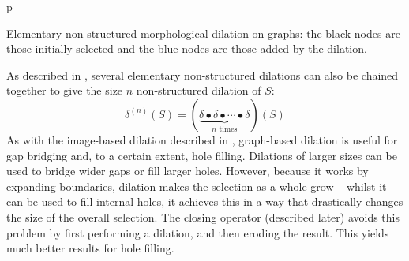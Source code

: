 \begin{stusubfig}{p}
	\hspace{12mm}%
\caption{Elementary non-structured morphological dilation on graphs: the black nodes are those initially selected and the blue nodes are those added by the dilation.}
\label{fig:featureid-techniques-dilation}
\end{stusubfig}

As described in \cite{heijmans92a}, several elementary non-structured dilations can also be chained together to give the size $n$ non-structured dilation of $S$:
%
\[
\delta^{(n)}(S) = (\underbrace{\delta \bullet \delta \bullet \cdots \bullet \delta}_{n \mbox{ times}})(S)
\]
%
As with the image-based dilation described in \cite{gonzalez02}, graph-based dilation is useful for gap bridging and, to a certain extent, hole filling. Dilations of larger sizes can be used to bridge wider gaps or fill larger holes. However, because it works by expanding boundaries, dilation makes the selection as a whole grow -- whilst it can be used to fill internal holes, it achieves this in a way that drastically changes the size of the overall selection. The closing operator (described later) avoids this problem by first performing a dilation, and then eroding the result. This yields much better results for hole filling.

